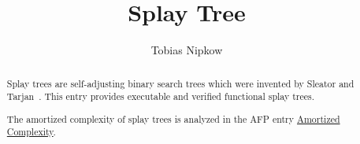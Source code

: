 \documentclass[11pt,a4paper]{article}
\begin{document}
\title{Splay Tree}
\author{Tobias Nipkow}
\maketitle

\begin{abstract}
Splay trees are self-adjusting binary search trees which were
invented by Sleator and Tarjan~\cite{SleatorT-JACM85}.
This entry provides executable and verified functional splay trees.

The amortized complexity of splay trees is analyzed in the AFP entry
\href{http://afp.sourceforge.net/entries/Amortized_Complexity.shtml}{Amortized Complexity}.
\end{abstract}

\tableofcontents





\end{document}
